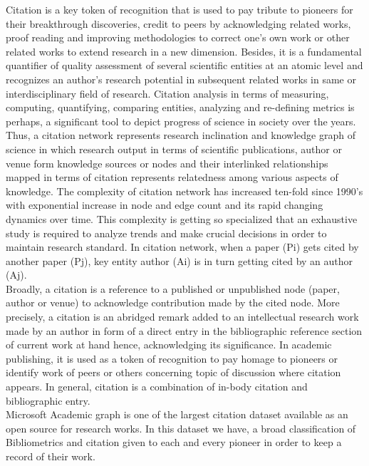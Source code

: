 Citation is a key token of recognition that is used to pay tribute to pioneers for their breakthrough discoveries, credit to peers by acknowledging related works, proof reading and improving methodologies to correct one’s own work or other related works to extend research in a new dimension. Besides, it is a fundamental quantifier of quality assessment of several scientific entities at an atomic level and recognizes an author’s research potential in subsequent related works in same or interdisciplinary field of research. Citation analysis in terms of measuring, computing, quantifying, comparing entities, analyzing and re-defining metrics is perhaps, a significant tool to depict progress of science in society over the years.\\
Thus, a citation network represents research inclination and knowledge graph of science in which research output in terms of scientific publications, author or venue form knowledge sources or nodes and their interlinked relationships mapped in terms of citation represents relatedness among various aspects of knowledge. The complexity of citation network has increased ten-fold since 1990’s with exponential increase in node and edge count and its rapid changing dynamics over time. This complexity is getting so specialized that an exhaustive study is required to analyze trends and make crucial decisions in order to maintain research standard. In citation network, when a paper (Pi) gets cited by another paper (Pj), key entity author (Ai) is in turn getting cited by an author (Aj).\\
Broadly, a citation is a reference to a published or unpublished node (paper, author or venue) to acknowledge contribution made by the cited node. More precisely, a citation is an abridged remark added to an intellectual research work made by an author in form of a direct entry in the bibliographic reference section of current work at hand hence, acknowledging its significance. In academic publishing, it is used as a token of recognition to pay homage to pioneers or identify work of peers or others concerning topic of discussion where citation appears. In general, citation is a combination of in-body citation and bibliographic entry.\\
Microsoft Academic graph is one of the largest citation dataset available as an open source for research works. In this dataset we have, a broad   classification of Bibliometrics and citation given to each and every pioneer in order to keep a record of their work. 

